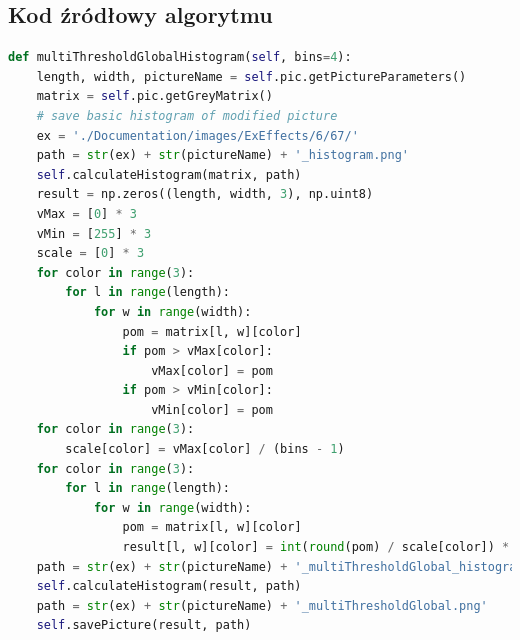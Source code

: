 \documentclass[a4paper,12pt, titlepage]{report}
\begin{document}
\subsection*{Kod źródłowy algorytmu}
\begin{lstlisting}[language=Python]
def multiThresholdGlobalHistogram(self, bins=4):
    length, width, pictureName = self.pic.getPictureParameters()
    matrix = self.pic.getGreyMatrix()
    # save basic histogram of modified picture
    ex = './Documentation/images/ExEffects/6/67/'
    path = str(ex) + str(pictureName) + '_histogram.png'
    self.calculateHistogram(matrix, path)
    result = np.zeros((length, width, 3), np.uint8)
    vMax = [0] * 3
    vMin = [255] * 3
    scale = [0] * 3
    for color in range(3):
        for l in range(length):
            for w in range(width):
                pom = matrix[l, w][color]
                if pom > vMax[color]:
                    vMax[color] = pom
                if pom > vMin[color]:
                    vMin[color] = pom
    for color in range(3):
        scale[color] = vMax[color] / (bins - 1)
    for color in range(3):
        for l in range(length):
            for w in range(width):
                pom = matrix[l, w][color]
                result[l, w][color] = int(round(pom) / scale[color]) * scale[color]
    path = str(ex) + str(pictureName) + '_multiThresholdGlobal_histogram.png'
    self.calculateHistogram(result, path)
    path = str(ex) + str(pictureName) + '_multiThresholdGlobal.png'
    self.savePicture(result, path)
\end{lstlisting}
\end{document}
